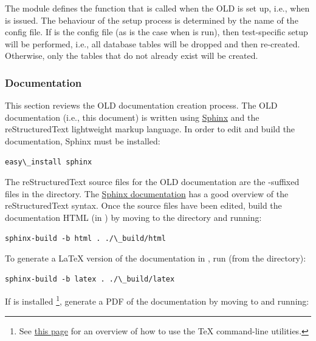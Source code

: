\documentclass[letterpaper,10pt,english]{sphinxmanual}
\begin{document}
The  module defines the  function that is called
when the OLD is set up, i.e., when  is
issued.  The behaviour of the setup process is determined by the name of the
config file.  If  is the config file (as is the case when
 is run), then test-specific setup will be performed, i.e., all
database tables will be dropped and then re-created.  Otherwise, only the tables
that do not already exist will be created.


\subsubsection{Documentation}
\label{installation:documentation}
This section reviews the OLD documentation creation process.  The OLD
documentation (i.e., this document) is written using
\href{http://sphinx-doc.org/}{Sphinx} and the reStructuredText lightweight markup
language.  In order to edit and build the documentation, Sphinx must be
installed:

\begin{Verbatim}[commandchars=\\\{\}]
easy\_install sphinx
\end{Verbatim}

The reStructuredText source files for the OLD documentation are the
-suffixed files in the  directory.  The
\href{http://sphinx-doc.org/contents.html}{Sphinx documentation} has a good
overview of the reStructuredText syntax.  Once the source files have been
edited, build the documentation HTML (in ) by moving to the
 directory and running:

\begin{Verbatim}[commandchars=\\\{\}]
sphinx-build -b html . ./\_build/html
\end{Verbatim}

To generate a LaTeX version of the documentation in , run
(from the  directory):

\begin{Verbatim}[commandchars=\\\{\}]
sphinx-build -b latex . ./\_build/latex
\end{Verbatim}

If  is installed \footnote{
See \href{http://www.charlietanksley.net/philtex/basics-of-latex-from-the-command-line/}{this page}
for an overview of how to use the TeX command-line utilities.
}, generate a PDF of the documentation by moving to
 and running:
\end{document}

